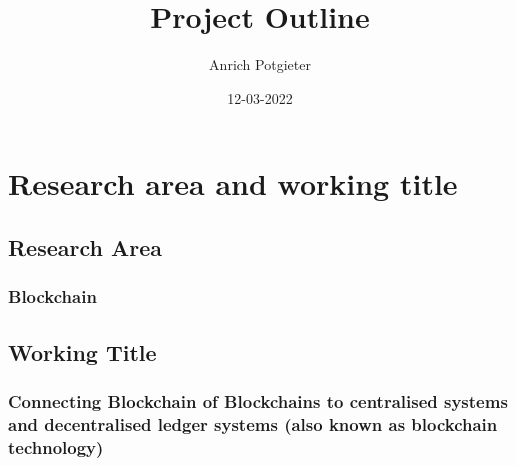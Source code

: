 \documentclass[12pt]{article}
\title{Project Outline}
\author{Anrich Potgieter}
\date{12-03-2022}
\begin{document}
\maketitle
\tableofcontents

\section{Research area and working title}
\subsection{Research Area}
\subsubsection{Blockchain}

\subsection{Working Title}
\subsubsection{Connecting Blockchain of Blockchains to centralised systems and decentralised ledger systems (also known as blockchain technology)}
\end{document}

